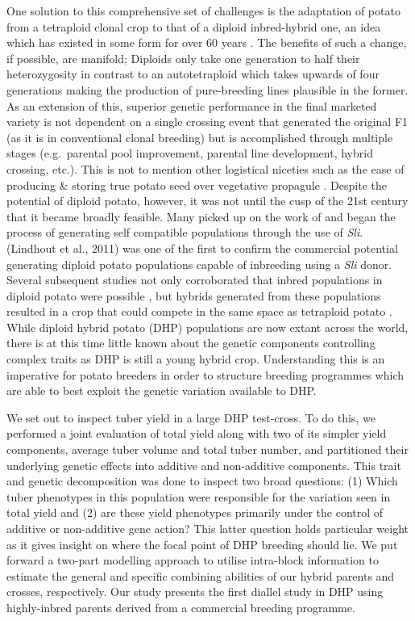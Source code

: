 \begin{refsection}
    One solution to this comprehensive set of challenges is the adaptation of potato from a tetraploid clonal crop to that of a diploid inbred-hybrid one, an idea which has existed in some form for over 60 years \parencite{Hougas1958}. The benefits of such a change, if possible, are manifold; Diploids only take one generation to half their heterozygosity in contrast to an autotetraploid which takes upwards of four generations making the production of pure-breeding lines plausible in the former. As an extension of this, superior genetic performance in the final marketed variety is not dependent on a single crossing event that generated the original F1 (as it is in conventional clonal breeding) but is accomplished through multiple stages (e.g.~parental pool improvement, parental line development, hybrid crossing, etc.). This is not to mention other logistical niceties such as the ease of producing \& storing true potato seed over vegetative propagule \parencite{Cock1983, Pallais1991, Thomas-Sharma2016}. Despite the potential of diploid potato, however, it was not until the cusp of the 21st century that it became broadly feasible. Many picked up on the work of \parencite{Hosaka1998} and began the process of generating self compatible populations through the use of \emph{Sli}. (Lindhout et al., 2011) was one of the first to confirm the commercial potential generating diploid potato populations capable of inbreeding using a \emph{Sli} donor. Several subsequent studies not only corroborated that inbred populations in diploid potato were possible \parencite{Alsahlany2021}, but hybrids generated from these populations resulted in a crop that could compete in the same space as tetraploid potato \parencite{Stockem2020, Zhang2021}. While diploid hybrid potato (DHP) populations are now extant across the world, there is at this time little known about the genetic components controlling complex traits as DHP is still a young hybrid crop. Understanding this is an imperative for potato breeders in order to structure breeding programmes which are able to best exploit the genetic variation available to DHP.

We set out to inspect tuber yield in a large DHP test-cross. To do this, we performed a joint evaluation of total yield along with two of its simpler yield components, average tuber volume and total tuber number, and partitioned their underlying genetic effects into additive and non-additive components. This trait and genetic decomposition was done to inspect two broad questions: (1) Which tuber phenotypes in this population were responsible for the variation seen in total yield and (2) are these yield phenotypes primarily under the control of additive or non-additive gene action? This latter question holds particular weight as it gives insight on where the focal point of DHP breeding should lie. We put forward a two-part modelling approach to utilise intra-block information to estimate the general and specific combining abilities of our hybrid parents and crosses, respectively. Our study presents the first diallel study in DHP using highly-inbred parents derived from a commercial breeding programme.



\end{refsection}
